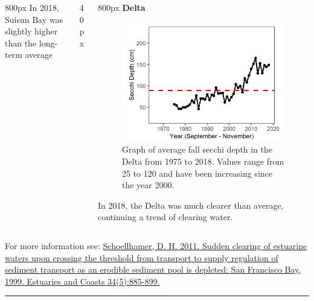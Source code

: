 \documentclass[
]{book}
\begin{document}
\begin{columns}[T]
\begin{column}{800px\textwidth}
In 2018, Suisun Bay was slightly higher than the long-term average
\end{column}

\begin{column}{40px\textwidth}
~
\end{column}

\begin{column}{800px\textwidth}
\textbf{Delta}

\begin{figure}
\includegraphics[width=15.25in]{figures/secchi_dtfall} \caption{Graph of average fall secchi depth in the Delta from 1975 to 2018. Values range from 25 to 120 and have been increasing since the year 2000.}\label{fig:unnamed-chunk-98}
\end{figure}

In 2018, the Delta was much clearer than average, continuing a trend of clearing water.
\end{column}
\end{columns}

\begin{disclaimer}
For more information see:
\href{https://link.springer.com/article/10.1007/s12237-011-9382-x}{Schoellhamer,
D. H. 2011. Sudden clearing of estuarine waters upon crossing the
threshold from transport to supply regulation of sediment transport as
an erodible sediment pool is depleted: San Francisco Bay, 1999.
Estuaries and Coasts 34(5):885-899.}
\end{disclaimer}

\begin{center}\rule{0.5\linewidth}{0.5pt}\end{center}
\end{document}
